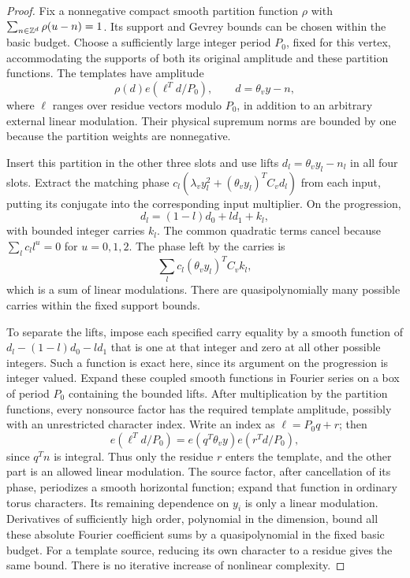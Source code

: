 \begin{proof}
Fix a nonnegative compact smooth partition function $\rho$ with
$\sum_{n\in\mathbb Z^d}\rho(u-n)=1$.  Its support and Gevrey bounds can be
chosen within the basic budget.  Choose a sufficiently large integer
period $P_0$, fixed for this vertex, accommodating the supports of both
its original amplitude and these partition functions.  The templates
have amplitude
\[
 \rho(d)e(\ell^T d/P_0),\qquad d=\theta_v y-n,
\]
where $\ell$ ranges over residue vectors modulo $P_0$, in addition to
an arbitrary external linear modulation.  Their physical supremum norms
are bounded by one because the partition weights are nonnegative.

Insert this partition in the other three slots and use lifts
$d_l=\theta_v y_l-n_l$ in all four slots.  Extract the matching phase
$c_l(\lambda_vy_l^2+(\theta_vy_l)^TC_vd_l)$ from each input, putting
its conjugate into the corresponding input multiplier.  On the
progression,
\[
 d_l=(1-l)d_0+ld_1+k_l,
\]
with bounded integer carries $k_l$.  The common quadratic terms cancel
because $\sum_l c_l l^u=0$ for $u=0,1,2$.  The phase left by the
carries is
\[
 \sum_l c_l(\theta_v y_l)^T C_v k_l,
\]
which is a sum of linear modulations.  There are quasipolynomially many
possible carries within the fixed support bounds.

To separate the lifts, impose each specified carry equality by a smooth
function of $d_l-(1-l)d_0-ld_1$ that is one at that integer and zero at
all other possible integers.  Such a function is exact here, since its
argument on the progression is integer valued.  Expand these coupled
smooth functions in Fourier series on a box of period $P_0$ containing
the bounded lifts.  After multiplication by the partition functions,
every nonsource factor has the required template amplitude, possibly
with an unrestricted character index.  Write an index as
$\ell=P_0q+r$; then
\[
 e(\ell^Td/P_0)=e(q^T\theta_v y)e(r^Td/P_0),
\]
since $q^Tn$ is integral.  Thus only the residue $r$ enters the template,
and the other part is an allowed linear modulation.  The source factor,
after cancellation of its phase, periodizes a smooth horizontal
function; expand that function in ordinary torus characters.  Its
remaining dependence on $y_i$ is only a linear modulation.  Derivatives
of sufficiently high order, polynomial in the dimension, bound all these
absolute Fourier coefficient sums by a quasipolynomial in the fixed
basic budget.  For a template source, reducing its own character to a
residue gives the same bound.  There is no iterative increase of
nonlinear complexity.


\end{proof}
